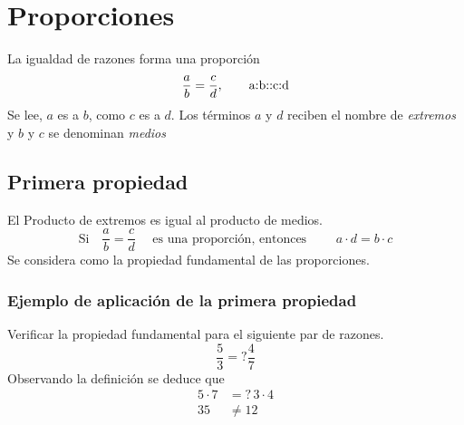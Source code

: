 \documentclass[10pt,twoside]{article}
\begin{document}
\section*{Proporciones}
La igualdad de razones forma una proporción
\[\dfrac{a}{b}=\dfrac{c}{d}, \text{\qquad a:b::c:d}\]
Se lee, $a$ es a $b$, como $c$ es a $d$. Los términos $a$ y $d$ reciben el nombre de \emph{extremos} y $b$ y $c$ se denominan \emph{medios}
\subsection*{Primera propiedad}
El Producto de extremos es igual al producto de medios.
\[\text{Si} \quad \dfrac{a}{b}=\dfrac{c}{d}\quad \text{ es una proporción, entonces }\qquad a\cdot d=b\cdot c\]
Se considera como la propiedad fundamental de las proporciones.
\subsubsection*{Ejemplo de aplicaci\'{o}n de la primera propiedad}
Verificar la propiedad fundamental para el siguiente par de razones.
\[\dfrac{5}{3}=?\dfrac{4}{7}\]
Observando la definición se deduce que 
\begin{align*}
5\cdot 7 &=?\, 3 \cdot 4\\
35&\neq12
\end{align*}
\end{document}
